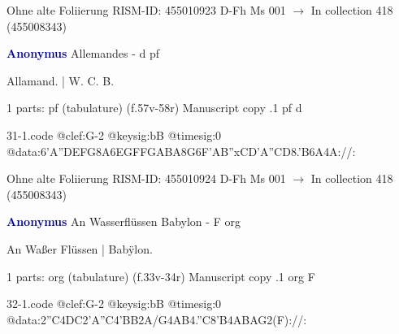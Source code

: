\documentclass[twocolumn]{book}
\begin{document}
\newline Ohne alte Foliierung
\newline RISM-ID: 455010923
\newline D-Fh  Ms 001
\newline $\rightarrow$ In collection 418 (455008343)
      
\newline \par \vspace{7pt} \textcolor{darkblue}{\textbf{Anonymus  }}
\newline Allemandes - d
\newline pf
\newline \begin{itshape}[f.57v, at left:] Allamand. | W. C. B.\end{itshape} 
\newline \textcolor{darkblue}{}  1 parts: pf (tabulature)  (f.57v-58r)
\newline Manuscript copy
.1  pf  d  
\begin{filecontents*}{31-1.code}
@clef:G-2
@keysig:bB
@timesig:0
@data:6'A{''DEFG}{8A6EG}{FFGA}{BA8G}{6F'AB''xC}{D'A''CD}{8.'B6A}4A://:
\end{filecontents*}
\newline
%

\newline Ohne alte Foliierung
\newline RISM-ID: 455010924
\newline D-Fh  Ms 001
\newline $\rightarrow$ In collection 418 (455008343)
      
\newline \par \vspace{7pt} \textcolor{darkblue}{\textbf{Anonymus  }}
\newline An Wasserflüssen Babylon - F
\newline org
\newline \begin{itshape}[f.33v, at left:] An Waßer Flüssen | Babÿlon.\end{itshape} 
\newline \textcolor{darkblue}{}  1 parts: org (tabulature)  (f.33v-34r)
\newline Manuscript copy
.1  org  F  
\begin{filecontents*}{32-1.code}
@clef:G-2
@keysig:bB
@timesig:0
@data:2''C4DC2'A''C4'BB2A/G4AB4.''C8'B4ABAG2(F)://:
\end{filecontents*}
\newline
%
\end{document}
